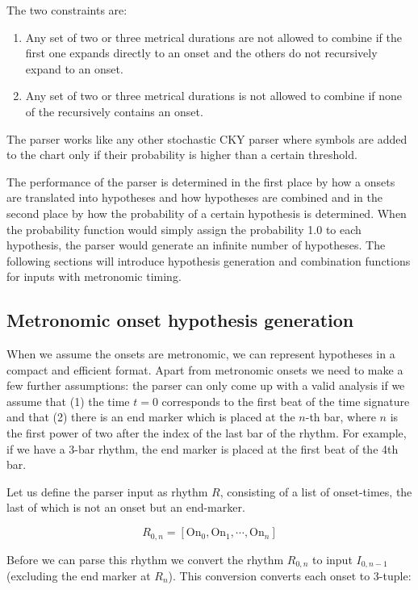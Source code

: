 \documentclass[a4paper,10pt]{article}
\begin{document}
The two constraints are:
\begin{enumerate}
\item Any set of two or three metrical durations are not allowed to combine if the first one expands directly to an onset and the others do not recursively expand to an onset.
\item Any set of two or three metrical durations is not allowed to combine if none of the recursively contains an onset.
\end{enumerate}

The parser works like any other stochastic CKY parser where symbols are added to the chart only if their probability is higher than a certain threshold.

The performance of the parser is determined in the first place by how a onsets are translated into hypotheses and how hypotheses are combined and in the second place by how the probability of a certain hypothesis is determined. When the probability function would simply assign the probability 1.0 to each hypothesis, the parser would generate an infinite number of hypotheses. The following sections will introduce hypothesis generation and combination functions for inputs with metronomic timing.

\subsection{Metronomic onset hypothesis generation}

When we assume the onsets are metronomic, we can represent hypotheses in a compact and efficient format. Apart from metronomic onsets we need to make a few further assumptions: the parser can only come up with a valid analysis if we assume that (1) the time $t=0$ corresponds to the first beat of the time signature and that (2) there is an end marker which is placed at the $n$-th bar, where $n$ is the first power of two after the index of the last bar of the rhythm. For example, if we have a 3-bar rhythm, the end marker is placed at the first beat of the 4th bar.

Let us define the parser input as rhythm $R$, consisting of a list of onset-times, the last of which is not an onset but an end-marker. 

\begin{equation}
R_{0,n} = [\textrm{On}_0, \textrm{On}_{1}, \cdots, \textrm{On}_n]
\end{equation}

Before we can parse this rhythm we convert the rhythm $R_{0,n}$ to input $I_{0,n-1}$ (excluding the end marker at $R_n$). This conversion converts each onset to 3-tuple:
\end{document}
